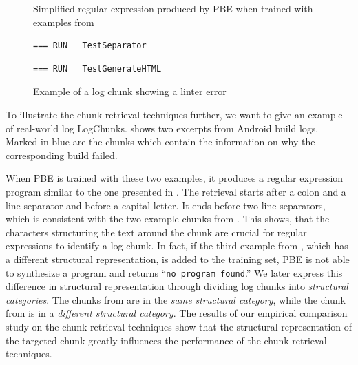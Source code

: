 \begin{figure}[tbp]
  \centering
  
  \caption{Simplified regular expression produced by PBE when trained
  with examples from }
  \label{lst:prose-program-simplified}
\end{figure}

\begin{figure}[tbp]
  \centering
  \begin{lstlisting}[breaklines=true,frame=tlr]
=== RUN   TestSeparator
  \end{lstlisting}
  \vspace{-\baselineskip}
  
  \vspace{-\baselineskip}
  \begin{lstlisting}[breaklines=true,frame=blr]
=== RUN   TestGenerateHTML
  \end{lstlisting}
  \caption{Example of a log chunk showing a linter error}
  \label{lst:chunk-example-3}
\end{figure}

To illustrate the chunk retrieval techniques further, we want to give
an example of real-world log LogChunks.
 shows two excerpts
from Android build logs.
Marked in blue are the chunks
which contain the information on why the
corresponding build failed.

When PBE is trained with these two examples, it produces
a regular expression program similar to the one presented in
.
The retrieval
starts after a colon and a line separator and before a capital
letter.
It ends before two line separators,
which is consistent with the two example
chunks from .
This shows, that the characters structuring the text around the chunk are
crucial for regular expressions to identify a log chunk.
In fact, if the third example from ,
which has a
different structural representation, is added to the training set,
PBE is not able to synthesize a program and returns
``\texttt{no program found}.''
We later express this difference in structural representation through
dividing log chunks into \emph{structural categories}.
The chunks from 
are in the \emph{same structural category}, while the chunk from
 is in a
\emph{different structural category}.
The results of our empirical comparison study on the chunk retrieval
techniques
show that the structural representation of the targeted chunk greatly
influences
the performance of the chunk retrieval techniques.

